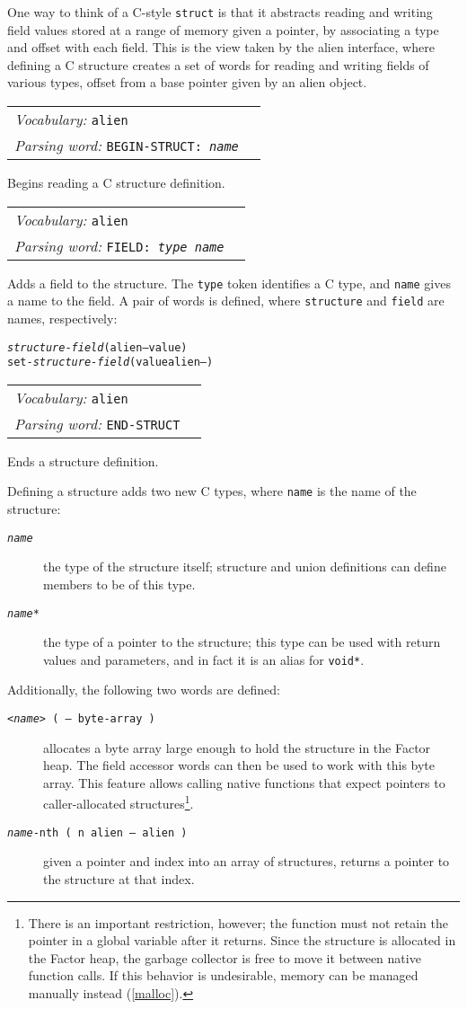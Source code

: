 \documentclass{book}
\newcommand{\vocabulary}[1]{\emph{Vocabulary:} \texttt{#1}&\\}
\newcommand{\parsingword}[2]{\index{\texttt{#1}}\emph{Parsing word:} \texttt{#2}&\\}
\newcommand{\wordtable}[1]{


\begin{tabularx}{12cm}{lX}
\hline
#1
\hline
\end{tabularx}

}
\begin{document}
One way to think of a C-style \verb|struct| is that it abstracts reading and writing field values stored at a range of memory given a pointer, by associating a type and offset with each field. This is the view taken by the alien interface, where defining a C structure creates a set of words for reading and writing fields of various types, offset from a base pointer given by an alien object.

\wordtable{
\vocabulary{alien}
\parsingword{BEGIN-STRUCT:}{BEGIN-STRUCT: \emph{name}}
}
Begins reading a C structure definition.
\wordtable{
\vocabulary{alien}
\parsingword{FIELD:}{FIELD: \emph{type} \emph{name}}
}
Adds a field to the structure. The \verb|type| token identifies a C type, and \verb|name| gives a name to the field. A pair of words is defined, where \verb|structure| and \verb|field| are names, respectively:
\begin{alltt}
\emph{structure}-\emph{field} ( alien -- value )
set-\emph{structure}-\emph{field} ( value alien -- )
\end{alltt}

\wordtable{
\vocabulary{alien}
\parsingword{END-STRUCT}{END-STRUCT}
}
Ends a structure definition.

Defining a structure adds two new C types, where \verb|name| is the name of the structure:
\begin{description}
\item[\texttt{\emph{name}}] the type of the structure itself; structure and union definitions can define members to be of this type.
\item[\texttt{\emph{name}*}] the type of a pointer to the structure; this type can be used with return values and parameters, and in fact it is an alias for \texttt{void*}.
\end{description}
Additionally, the following two words are defined:
\begin{description}
\item[\texttt{<\emph{name}> ( -- byte-array )}] allocates a byte array large enough to hold the structure in the Factor heap. The field accessor words can then be used to work with this byte array. This feature allows calling native functions that expect pointers to caller-allocated structures\footnote{
There is an important restriction, however; the function must not retain the pointer in a global variable after it returns. Since the structure is allocated in the Factor heap, the garbage collector is free to move it between native function calls. If this behavior is undesirable, memory can be managed manually instead (\ref{malloc}).}.
\item[\texttt{\emph{name}-nth ( n alien -- alien )}] given a pointer and index into an array of structures, returns a pointer to the structure at that index.
\end{description}
\end{document}
